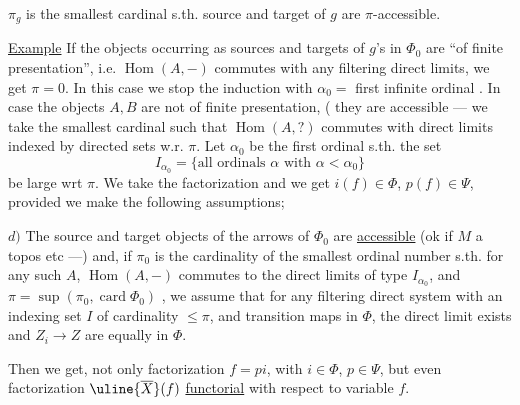 $\pi_g$ is the smallest cardinal s.th. source and target of $g$ are $\pi$-accessible.

\uline{Example} If the objects occurring as sources and targets of $g$'s in $\Phi_0$ are ``of finite presentation'', i.e. $\operatorname{Hom}(A,-)$ commutes with any filtering direct limits, we get $\pi=0$. In this case we stop the induction with $\alpha_0=$ first infinite ordinal . In case the objects $A,B$ are not of finite presentation, ( they are accessible
--- we take the smallest cardinal such that $\operatorname{Hom}(A,?)$ commutes with direct limits indexed by  directed sets   w.r. $\pi$.
Let  $\alpha_0$ be the first ordinal s.th. the set
\[
I_{\alpha_0}=\{\text{all ordinals }\alpha\text{ with }\alpha<\alpha_0\}
\]
be  large wrt $\pi$. We take the factorization
and we get $i(f)\in\Phi$, $p(f)\in\Psi$, provided we make the following assumptions;

$d)$ The  source and target objects of the arrows of $\Phi_0$ are \uline{accessible}
(ok if $M$ a topos etc ---) and, if $\pi_0$ is the cardinality of the smallest ordinal number  s.th. for any such $A$, $\operatorname{Hom}(A,-)$ commutes to the direct limits of type $I_{\alpha_0}$,  and \deleted{$\pi=\sup(\unsure{\pi}$}
$\pi=\sup(\pi_0,\operatorname{card}\Phi_0)$ , we assume that for any filtering direct system with an indexing set $I$ of cardinality $\leq\pi$, and transition maps in $\Phi$, the direct limit exists and  $Z_i\to Z$ are equally in $\Phi$.

Then we get, not only factorization $f=pi$, with $i\in\Phi$, $p\in\Psi$, but even factorization $\uline{\overline X}(f)$ \uline{functorial} with respect to variable $f$.

